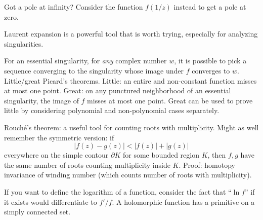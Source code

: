 Got a pole at infinity? Consider the function $f(1/z)$ instead to get a pole at zero.

Laurent expansion is a powerful tool that is worth trying, especially for analyzing singularities.

For an essential singularity, for \emph{any} complex number $w$, it is possible to pick a sequence converging to the singularity whose image under $f$ converges to $w$. Little/great Picard's theorems. Little: an entire and non-constant function misses at most one point. Great: on any punctured neighborhood of an essential singularity, the image of $f$ misses at most one point. Great can be used to prove little by considering polynomial and non-polynomial cases separately.

Rouch\'e's theorem: a useful tool for counting roots with multiplicity. Might as well remember the symmetric version: if
\[
	|f(z)-g(z)| < |f(z)| + |g(z)|
\]
everywhere on the simple contour $\partial K$ for some bounded region $K$, then $f,g$ have the same number of roots counting multiplicity inside $K$. Proof: homotopy invariance of winding number (which counts number of roots with multiplicity).

If you want to define the logarithm of a function, consider the fact that ``$\ln f$'' if it exists would differentiate to $f'/f$. A holomorphic function has a primitive on a simply connected set.